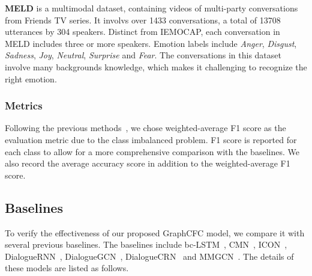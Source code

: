 \documentclass[lettersize,journal]{IEEEtran}
\begin{document}
\textbf{MELD} is a multimodal dataset, containing videos of multi-party conversations from Friends TV series. It involvs over 1433 conversations, a total of 13708 utterances by 304 speakers. Distinct from IEMOCAP, each conversation in MELD includes three or more speakers. Emotion labels include \textit{Anger}, \textit{Disgust}, \textit{Sadness}, \textit{Joy}, \textit{Neutral}, \textit{Surprise} and \textit{Fear}. The conversations in this dataset involve many backgrounds knowledge, which makes it challenging to recognize the right emotion.

\subsubsection{Metrics}
Following the previous methods~\cite{ghosal2019dialoguegcn, hu2021mmgcn}, we chose weighted-average F1 score as the evaluation metric due to the class imbalanced problem. F1 score is reported for each class to allow for a more comprehensive comparison with the baselines. We also record the average accuracy score in addition to the weighted-average F1 score.

\subsection{Baselines}
To verify the effectiveness of our proposed GraphCFC model, we compare it with several previous baselines. The baselines include bc-LSTM~\cite{poria2017context}, CMN~\cite{hazarika2018conversational}, ICON~\cite{hazarika2018icon}, DialogueRNN~\cite{majumder2019dialoguernn}, DialogueGCN~\cite{ghosal2019dialoguegcn}, DialogueCRN~\cite{hu2021dialoguecrn} and MMGCN~\cite{hu2021mmgcn}. The details of these models are listed as follows.
\end{document}
